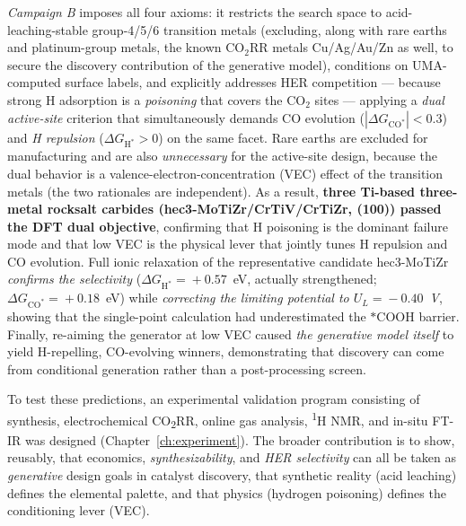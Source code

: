 \documentclass[11pt,a4paper]{report}
\newcommand{\dGCO}{\Delta G_{\mathrm{CO^*}}}
\newcommand{\dGH}{\Delta G_{\mathrm{H^*}}}
\begin{document}
\emph{Campaign B} imposes all four axioms: it restricts the search space to acid-leaching-stable group-4/5/6
transition metals (excluding, along with rare earths and platinum-group metals, the known CO$_2$RR metals
Cu/Ag/Au/Zn as well, to secure the discovery contribution of the generative model), conditions on UMA-computed
surface labels, and explicitly addresses HER competition --- because strong H adsorption is a \emph{poisoning} that
covers the CO$_2$ sites --- applying a \emph{dual active-site} criterion that simultaneously demands CO evolution
($|\dGCO|<0.3$) and \emph{H repulsion} ($\dGH>0$) on the same facet. Rare earths are excluded for manufacturing and
are also \emph{unnecessary} for the active-site design, because the dual behavior is a valence-electron-concentration
(VEC) effect of the transition metals (the two rationales are independent). As a result, \textbf{three Ti-based
three-metal rocksalt carbides (hec3-MoTiZr/CrTiV/CrTiZr, (100)) passed the DFT dual objective}, confirming that H
poisoning is the dominant failure mode and that low VEC is the physical lever that jointly tunes H repulsion and CO
evolution. Full ionic relaxation of the representative candidate hec3-MoTiZr \emph{confirms the selectivity}
($\dGH\!=\!+0.57$~eV, actually strengthened; $\dGCO\!=\!+0.18$~eV) while \emph{correcting the limiting potential to
$U_L\!=\!-0.40$~V}, showing that the single-point calculation had underestimated the $*$COOH barrier. Finally,
re-aiming the generator at low VEC caused \emph{the generative model itself} to yield H-repelling, CO-evolving
winners, demonstrating that discovery can come from conditional generation rather than a post-processing screen.

To test these predictions, an experimental validation program consisting of synthesis, electrochemical
CO\textsubscript{2}RR, online gas analysis, \textsuperscript{1}H NMR, and in-situ FT-IR was designed
(Chapter~\ref{ch:experiment}). The broader contribution is to show, reusably, that economics, \emph{synthesizability},
and \emph{HER selectivity} can all be taken as \emph{generative} design goals in catalyst discovery, that synthetic
reality (acid leaching) defines the elemental palette, and that physics (hydrogen poisoning) defines the conditioning
lever (VEC).
\end{document}
